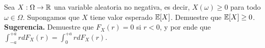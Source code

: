 \documentclass[12pt,a4paper]{article}
\begin{document}
    \begin{mdframed}[style=mdpinkbox,frametitle={Ejercicio 7}]
        Sea $X:\Omega\to\mathbb{R}$ una variable aleatoria no negativa, es decir, $X(\omega)\geq0$ para todo $\omega\in\Omega$.
        Supongamos que $X$ tiene valor esperado $\mathbb{E}[X]$. Demuestre que $\mathbb{E}[X]\geq0$. \textbf{Sugerencia.} Demuestre que
        $F_{X}(r)=0$ si $r\lt0$, y por ende que $\int_{-a}^{+a}rdF_{X}(r)=\int_{0}^{+a}rdF_{X}(r)$.
    \end{mdframed}
\end{document}
